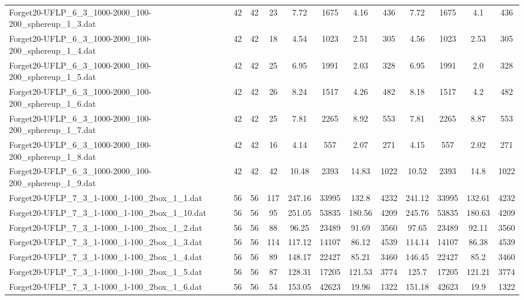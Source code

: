 \begin{sidewaystable}[!ht]
{\begin{tabular}{lccccccccccc}
Forget20-UFLP\_6\_3\_1000-2000\_100-200\_sphereup\_1\_3.dat & 42 & 42 & 23 & 7.72 & 1675 & 4.16 & 436 & 7.72 & 1675 &  \textcolor{blue2}{4.1} & 436 \\
Forget20-UFLP\_6\_3\_1000-2000\_100-200\_sphereup\_1\_4.dat & 42 & 42 & 18 & 4.54 & 1023 &  \textcolor{blue2}{2.51} & 305 & 4.56 & 1023 & 2.53 & 305 \\
Forget20-UFLP\_6\_3\_1000-2000\_100-200\_sphereup\_1\_5.dat & 42 & 42 & 25 & 6.95 & 1991 & 2.03 & 328 & 6.95 & 1991 &  \textcolor{blue2}{2.0} & 328 \\
Forget20-UFLP\_6\_3\_1000-2000\_100-200\_sphereup\_1\_6.dat & 42 & 42 & 26 & 8.24 & 1517 & 4.26 & 482 & 8.18 & 1517 &  \textcolor{blue2}{4.2} & 482 \\
Forget20-UFLP\_6\_3\_1000-2000\_100-200\_sphereup\_1\_7.dat & 42 & 42 & 25 &  \textcolor{blue2}{7.81} & 2265 & 8.92 & 553 &  \textcolor{blue2}{7.81} & 2265 & 8.87 & 553 \\
Forget20-UFLP\_6\_3\_1000-2000\_100-200\_sphereup\_1\_8.dat & 42 & 42 & 16 & 4.14 & 557 & 2.07 & 271 & 4.15 & 557 &  \textcolor{blue2}{2.02} & 271 \\
Forget20-UFLP\_6\_3\_1000-2000\_100-200\_sphereup\_1\_9.dat & 42 & 42 & 42 &  \textcolor{blue2}{10.48} & 2393 & 14.83 & 1022 & 10.52 & 2393 & 14.8 & 1022 \\
Forget20-UFLP\_7\_3\_1-1000\_1-100\_2box\_1\_1.dat & 56 & 56 & 117 & 247.16 & 33995 & 132.8 & 4232 & 241.12 & 33995 & 132.61 & 4232 \\
Forget20-UFLP\_7\_3\_1-1000\_1-100\_2box\_1\_10.dat & 56 & 56 & 95 & 251.05 & 53835 & 180.56 & 4209 & 245.76 & 53835 & 180.63 & 4209 \\
Forget20-UFLP\_7\_3\_1-1000\_1-100\_2box\_1\_2.dat & 56 & 56 & 88 & 96.25 & 23489 &  \textcolor{blue2}{91.69} & 3560 & 97.65 & 23489 & 92.11 & 3560 \\
Forget20-UFLP\_7\_3\_1-1000\_1-100\_2box\_1\_3.dat & 56 & 56 & 114 & 117.12 & 14107 & 86.12 & 4539 & 114.14 & 14107 & 86.38 & 4539 \\
Forget20-UFLP\_7\_3\_1-1000\_1-100\_2box\_1\_4.dat & 56 & 56 & 89 & 148.17 & 22427 & 85.21 & 3460 & 146.45 & 22427 &  \textcolor{blue2}{85.2} & 3460 \\
Forget20-UFLP\_7\_3\_1-1000\_1-100\_2box\_1\_5.dat & 56 & 56 & 87 & 128.31 & 17205 & 121.53 & 3774 & 125.7 & 17205 &  \textcolor{blue2}{121.21} & 3774 \\
Forget20-UFLP\_7\_3\_1-1000\_1-100\_2box\_1\_6.dat & 56 & 56 & 54 & 153.05 & 42623 & 19.96 & 1322 & 151.18 & 42623 &  \textcolor{blue2}{19.9} & 1322 \\

\end{tabular}}
\end{sidewaystable}
